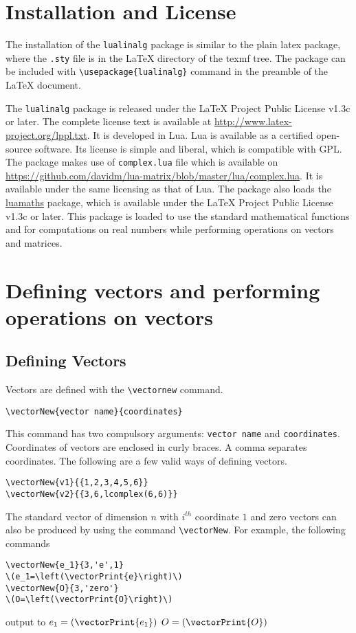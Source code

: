 \documentclass{article}
\begin{document}
\section{Installation and License}
The installation of the \verb|lualinalg| package is similar to the plain latex package, where the \verb|.sty| file is in the LaTeX directory of the texmf tree. The package can be included with \verb|\usepackage{lualinalg}| command in the preamble of the LaTeX document.

The \verb|lualinalg| package is released under the LaTeX Project Public License v1.3c or later. The complete license text is available at  \url{http://www.latex-project.org/lppl.txt}. It is developed in Lua. Lua is available as a certified open-source software. Its license is simple and liberal, which is compatible with GPL. The package makes use of \verb|complex.lua| file which is available on \url{https://github.com/davidm/lua-matrix/blob/master/lua/complex.lua}. It  is available under the same licensing as that of Lua. The package also loads the \href{https://ctan.org/pkg/luamaths}{luamaths} package, which is available under the LaTeX Project Public License v1.3c or later. This package is loaded to use the standard mathematical functions and for computations on real numbers while performing operations on vectors and matrices.

\section{Defining vectors and performing operations on vectors} 
\subsection{Defining Vectors} Vectors are defined with the \verb|\vectornew| command.
\begin{lstlisting}
\vectorNew{vector name}{coordinates}
\end{lstlisting}

 This command has two compulsory arguments: \verb|vector name| and \verb|coordinates|. Coordinates of vectors are enclosed in curly braces. A comma separates coordinates.  The following are a few valid ways of defining vectors.
\begin{lstlisting}
\vectorNew{v1}{{1,2,3,4,5,6}}
\vectorNew{v2}{{3,6,lcomplex(6,6)}}
\end{lstlisting}
The standard vector of dimension \(n \) with \(i^{th}\)  coordinate \(1\) and zero vectors can also be produced by using the command \verb|\vectorNew|. For example, the following commands
\begin{lstlisting}
\vectorNew{e_1}{3,'e',1}
\(e_1=\left(\vectorPrint{e}\right)\)
\vectorNew{O}{3,'zero'}
\(O=\left(\vectorPrint{O}\right)\)
\end{lstlisting}
output to 
\(e_1=\left(\vectorPrint{e_1}\right)\)
\(O=\left(\vectorPrint{O}\right)\)
\end{document}
